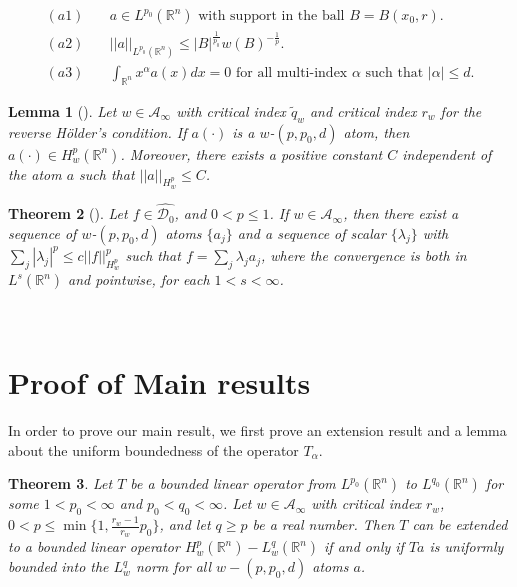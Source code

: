 \documentclass[a4paper,12pt,reqno]{amsart}
\numberwithin{equation}{section}
\newtheorem{theorem}{Theorem}[section]
\newtheorem{lemma}[theorem]{Lemma}
\begin{document}
	$$\begin{aligned}
		(a1)  \quad &  a \in L^{p_0}(\mathbb{R}^{n}) \text{ with support in the ball $B=B(x_0,r)$.} \\
		(a2) \quad  &  ||a||_{L^{p_0}(\mathbb{R}^{n})} \leq |B|^{\frac{1}{p_0}}w(B)^{-\frac{1}{p}}. \\
		(a3) \quad & \int_{\mathbb{R}^{n}} x^{\alpha} a(x) dx=0 \text{ for all multi-index $\alpha$ such that $|\alpha|\leq d$}.
	\end{aligned}
	$$
	
	\begin{lemma}[\cite{Rocha}]\label{Lemma8} Let $w \in \mathcal{A}_{\infty}$ with critical index $\tilde{q}_w$ and critical index $r_w$ for the reverse H\"{o}lder's condition. If $a(\cdot)$ is a $w$-$(p,p_0,d)$ atom, then $a(\cdot) \in H^{p}_w(\mathbb{R}^{n})$. Moreover, there exists a positive constant $C$ independent of the atom $a$ such that $||a||_{H^{p}_w} \leq C$. 
	\end{lemma}
	\begin{theorem}[\cite{Rocha}]\label{Theorem9}
		Let $f \in \hat{\mathcal{D}_0}$, and $0<p \leq 1$. If $w \in \mathcal{A}_{\infty}$, then there exist a sequence of $w$-$(p,p_0,d)$ atoms $\{a_j\}$ and a sequence of scalar $\{\lambda_j\}$ with $\sum_j |\lambda_j|^{p} \leq c||f||^{p}_{H^{p}_w}$ such that $f=\sum_j \lambda_ja_j$, where the convergence is both in $L^{s}(\mathbb{R}^{n})$ and pointwise, for each $1<s<\infty$.
	\end{theorem}
	
	\ 
	
	
	
	\section{Proof of Main results}
	
	In order to prove our main result, we first prove an extension result and a lemma about the uniform boundedness of the operator $T_{\alpha}$. 
	
	\begin{theorem}\label{Extension}
		Let $T$ be a bounded linear operator from $L^{p_0}(\mathbb{R}^{n})$ to $L^{q_0}(\mathbb{R}^{n})$ for some $1<p_0<\infty$ and $p_0<q_0<\infty$. Let $w \in \mathcal{A}_{\infty}$ with critical index $r_w$, $0<p \leq \min \{1, \frac{r_w-1}{r_w} p_0 \}$, and let $q\geq p$ be a real number. Then $T$ can be extended to a bounded linear operator $H^{p}_w(\mathbb{R}^{n})-L^{q}_w(\mathbb{R}^{n})$ if and only if $Ta$ is uniformly bounded into the $L^{q}_w$ norm for all $w-(p,p_0,d)$ atoms $a$.
	\end{theorem}
	
\end{document}
